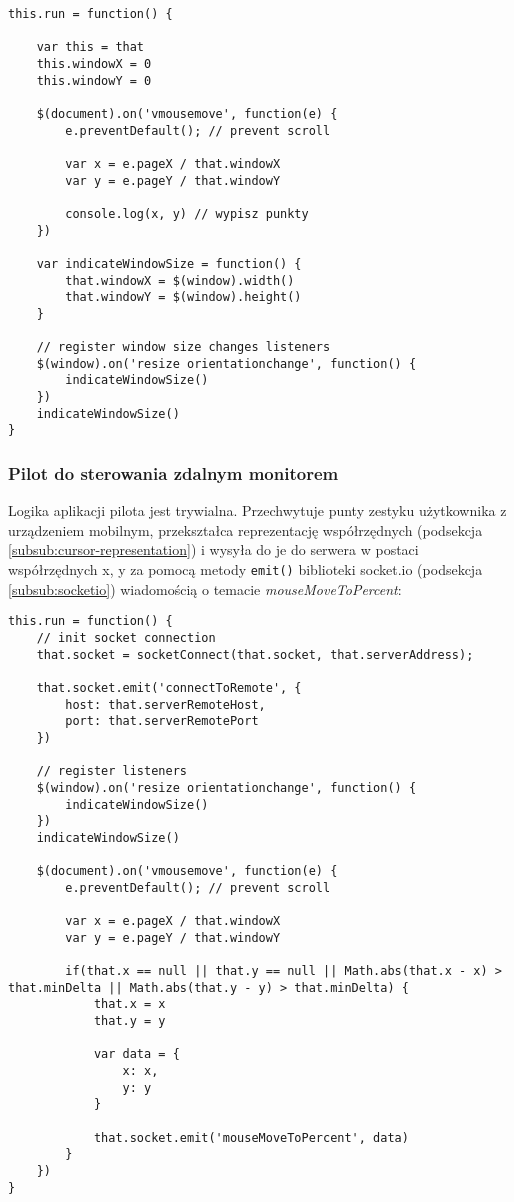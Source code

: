 \lstset{language=JavaScript}
\begin{lstlisting}
this.run = function() {
	
	var this = that
	this.windowX = 0
	this.windowY = 0
	
	$(document).on('vmousemove', function(e) {
		e.preventDefault(); // prevent scroll
		
		var x = e.pageX / that.windowX
		var y = e.pageY / that.windowY
		
		console.log(x, y) // wypisz punkty
	})
	
	var indicateWindowSize = function() {
		that.windowX = $(window).width()
		that.windowY = $(window).height()
	}
	
	// register window size changes listeners
	$(window).on('resize orientationchange', function() {
		indicateWindowSize()
	})
	indicateWindowSize()
}
\end{lstlisting}

\subsubsection{Pilot do sterowania zdalnym monitorem}

Logika aplikacji pilota jest trywialna. Przechwytuje punty zestyku użytkownika z urządzeniem mobilnym, przekształca reprezentację współrzędnych (podsekcja \ref{subsub:cursor-representation}) i wysyła do je do serwera w postaci współrzędnych x, y za pomocą metody \lstinline{emit()} biblioteki socket.io (podsekcja \ref{subsub:socketio}) wiadomością o temacie \emph{mouseMoveToPercent}:

\lstset{language=JavaScript}
\begin{lstlisting}
this.run = function() {
	// init socket connection
	that.socket = socketConnect(that.socket, that.serverAddress);
	
	that.socket.emit('connectToRemote', {
		host: that.serverRemoteHost,
		port: that.serverRemotePort
	})
	
	// register listeners
	$(window).on('resize orientationchange', function() {
		indicateWindowSize()
	})
	indicateWindowSize()
	
	$(document).on('vmousemove', function(e) {
		e.preventDefault(); // prevent scroll
		
		var x = e.pageX / that.windowX
		var y = e.pageY / that.windowY
		
		if(that.x == null || that.y == null || Math.abs(that.x - x) > that.minDelta || Math.abs(that.y - y) > that.minDelta) {
			that.x = x
			that.y = y
			
			var data = {
				x: x,
				y: y
			}
			
			that.socket.emit('mouseMoveToPercent', data)
		}
	})
}
\end{lstlisting}

